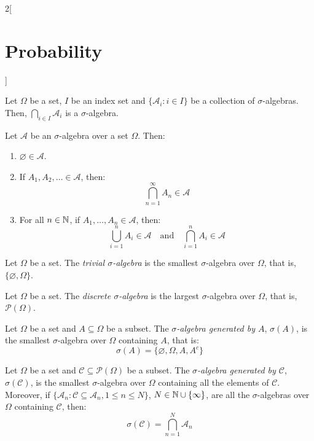 \documentclass[../../../main.tex]{subfiles}
\begin{document}
\begin{multicols}{2}[\section{Probability}]
\begin{definition}
\begin{enumerate}
    \end{enumerate}
  \end{definition}
  \begin{prop}
    Let $\Omega$ be a set, $I$ be an index set and $\{\mathcal{A}_i:i\in I\}$ be a collection of $\sigma$-algebras. Then, $\bigcap_{i\in I} \mathcal{A}_i$ is a $\sigma$-algebra.
  \end{prop}
  \begin{prop}
    Let $\mathcal{A}$ be an $\sigma$-algebra over a set $\Omega$. Then:
    \begin{enumerate}
      \item $\varnothing\in\mathcal{A}$.
      \item If $A_1,A_2,\ldots\in\mathcal{A}$, then: $$\bigcap_{n=1}^\infty A_n\in\mathcal{A}$$
      \item For all $n\in\mathbb{N}$, if $A_1,\ldots,A_n\in\mathcal{A}$, then: $$\bigcup_{i=1}^nA_i\in\mathcal{A}\quad\text{and}\quad\bigcap_{i=1}^nA_i\in\mathcal{A}$$
    \end{enumerate}
  \end{prop}
  \begin{definition}
    Let $\Omega$ be a set. The \textit{trivial $\sigma$-algebra} is the smallest $\sigma$-algebra over $\Omega$, that is, $\{\varnothing,\Omega\}$.
  \end{definition}
  \begin{definition}
    Let $\Omega$ be a set. The \textit{discrete $\sigma$-algebra} is the largest $\sigma$-algebra over $\Omega$, that is, $\mathcal{P}(\Omega)$.
  \end{definition}
  \begin{definition}
    Let $\Omega$ be a set and $A\subseteq\Omega$ be a subset. The \textit{$\sigma$-algebra generated by $A$}, $\sigma(A)$, is the smallest $\sigma$-algebra over $\Omega$ containing $A$, that is: $$\sigma(A)=\{\varnothing,\Omega,A,A^c\}$$
  \end{definition}
  \begin{definition}
    Let $\Omega$ be a set and $\mathcal{C}\subseteq\mathcal{P}(\Omega)$ be a subset. The \textit{$\sigma$-algebra generated by $\mathcal{C}$}, $\sigma(\mathcal{C})$, is the smallest $\sigma$-algebra over $\Omega$ containing all the elements of $\mathcal{C}$. Moreover, if $\{\mathcal{A}_n:\mathcal{C}\subseteq\mathcal{A}_n,1\leq n\leq N\}$, $N\in\mathbb{N}\cup\{\infty\}$, are all the $\sigma$-algebras over $\Omega$ containing $\mathcal{C}$, then:
    $$\sigma(\mathcal{C})=\bigcap_{n=1}^N\mathcal{A}_n$$
  \end{definition}

\end{multicols}
\end{document}
